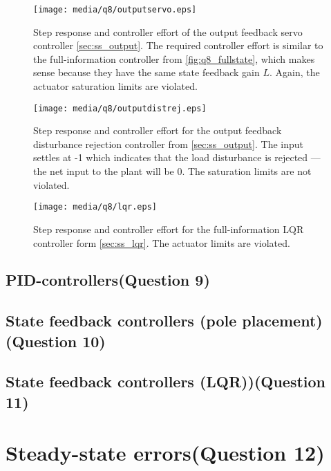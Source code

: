 \begin{figure}[ht!]
    \centering
    \texttt{[image: media/q8/outputservo.eps]}
    \caption{Step response and controller effort of the output feedback servo controller \cref{sec:ss_output}. The required controller effort is similar to the full-information controller from \cref{fig:q8_fullstate}, which makes sense because they have the same state feedback gain $L$. Again, the actuator saturation limits are violated.}
    \label{fig:q8_outputservo}
\end{figure}

\begin{figure}[ht!]
    \centering
    \texttt{[image: media/q8/outputdistrej.eps]}
    \caption{Step response and controller effort for the output feedback disturbance rejection controller from \cref{sec:ss_output}. The input settles at -1 which indicates that the load disturbance is rejected --- the net input to the plant will be 0. The saturation limits are not violated.}
    \label{fig:q8_outputdistrej}
\end{figure}

\begin{figure}[ht!]
    \centering
    \texttt{[image: media/q8/lqr.eps]}
    \caption{Step response and controller effort for the full-information LQR controller form \cref{sec:ss_lqr}. The actuator limits are violated.}
    \label{fig:q8_lqr}
\end{figure}

\subsection{PID-controllers\textnormal{\phantom{xxx}(Question 9)}}
\label{sec:retunepid}



\subsection{State feedback controllers (pole placement)\textnormal{\phantom{xxx}(Question 10)}}
\label{sec:retunepolep}
\subsection{State feedback controllers (LQR))\textnormal{\phantom{xxx}(Question 11)}}
\label{sec:retunelqr}

\section{Steady-state errors\textnormal{\phantom{xxx}(Question 12)}}
\label{sec:q12}